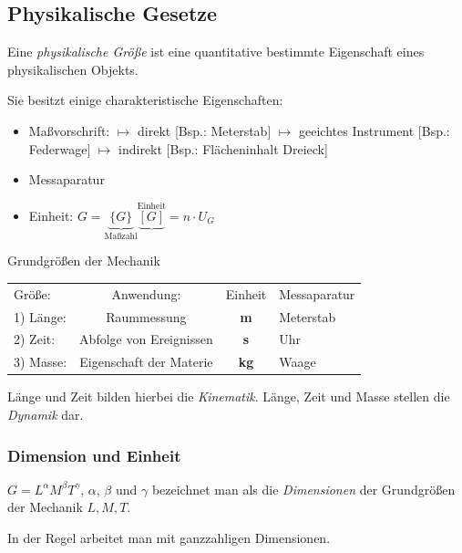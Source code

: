 \documentclass[a4paper,10pt]{scrartcl}
\begin{document}
\subsection{Physikalische Gesetze}
Eine \emph{physikalische Größe}  ist eine quantitative bestimmte Eigenschaft eines  physikalischen Objekts.

Sie besitzt einige charakteristische Eigenschaften:
\begin{itemize}
 \item Maßvorschrift: 
\subitem $\mapsto$ direkt [Bsp.: Meterstab]
\subitem $\mapsto$ geeichtes Instrument [Bsp.: Federwage]
\subitem $\mapsto$ indirekt [Bsp.: Flächeninhalt Dreieck] 
 \item Messaparatur
 \item Einheit:  $G=\underbrace{\{G\}}_{\text{Maßzahl}}\underbrace{[G]}^{\text{Einheit}}=n\cdot U_G$
\end{itemize}
\begin{ex} Grundgrößen der Mechanik
\begin{table}[h]
\begin{tabular}{l c c l}
 Größe:  &   Anwendung: & Einheit & Messaparatur\\
 1) Länge: &  Raummessung & \textbf{m} & Meterstab\\
 2) Zeit: & Abfolge von Ereignissen & \textbf{s} & Uhr\\
 3) Masse: & Eigenschaft der Materie & \textbf{kg} & Waage
\end{tabular}
\end{table}

Länge und Zeit bilden hierbei die \emph{Kinematik}.  Länge, Zeit und Masse stellen die \emph{Dynamik} dar.
\end{ex}

\subsubsection{Dimension und Einheit}
$G=L^\alpha M^\beta T^{\gamma}$, $\alpha$, $\beta$ und $\gamma$ bezeichnet man als die \emph{Dimensionen} der Grundgrößen der Mechanik $L, M, T$.
\begin{note}
 In der Regel arbeitet man mit ganzzahligen Dimensionen.
\end{note}
\end{document}
